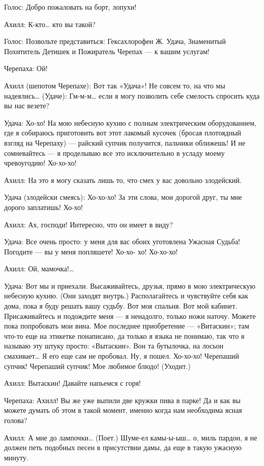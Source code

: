 Голос: Добро пожаловать на борт, лопухи!

Ахилл: К-кто\ldots{} кто вы такой?

Голос: Позвольте представиться: Гексахлорофен Ж. Удача, Знаменитый Похититель Детишек и Пожиратель Черепах --- к вашим услугам!

Черепаха: Ой!

Ахилл (шепотом Черепахе): Вот так «Удача»! Не совсем то, на что мы надеялись\ldots{} (Удаче): Гм-м-м\ldots{} если я могу позволить себе смелость спросить куда вы нас везете?

Удача: Хо-хо! На мою небесную кухню с полным электрическим оборудованием, где я собираюсь приготовить вот этот лакомый кусочек (бросая плотоядный взгляд на Черепаху) --- райский супчик получится, пальчики оближешь! И не сомневайтесь --- я проделываю все это исключительно в усладу моему чревоугодию! Хо-хо-хо!

Ахилл: На это я могу сказать лишь то, что смех у вас довольно злодейский.

Удача (злодейски смеясь): Хо-хо-хо! За эти слова, мои дорогой друг, ты мне дорого заплатишь! Хо-хо!

Ахилл: Ах, господи! Интересно, что он имеет в виду?

Удача: Все очень просто: у меня для вас обоих уготовлена Ужасная Судьба! Погодите --- вы у меня попляшете! Хо-хо- хо! Хо-хо-хо!

Ахилл: Ой, мамочка!\ldots{}

Удача: Вот мы и приехали. Высаживайтесь, друзья, прямо в мою электрическую небесную кухню. (Они заходят внутрь.) Располагайтесь и чувствуйте себя как дома, пока я буду решать вашу судьбу. Вот моя спальня. Вот мой кабинет. Присаживайтесь и подождите меня --- я ненадолго, только ножи наточу. Можете пока попробовать мои вина. Мое последнее приобретение --- «Витаскин»; там что-то еще на этикетке понаписано, да только я языка не понимаю, так что я называю эту штуку просто: «Вытаскин». Вон та бутылочка, на лосьон смахивает\ldots{} Я его еще сам не пробовал. Ну, я пошел. Хо-хо-хо! Черепаший супчик! Черепаший супчик! Мое любимое блюдо! (Уходит.)

Ахилл: Вытаскин! Давайте напьемся с горя!

Черепаха: Ахилл! Вы же уже выпили две кружки пива в парке! Да и как вы можете думать об этом в такой момент, именно когда нам необходима ясная голова?

Ахилл: А мне до лампочки\ldots{} (Поет.) Шуме-ел камы-ы-ыш\ldots{} о, миль пардон, я не должен петь подобных песен в присутствии дамы, да еще в такую ужасную минуту.

